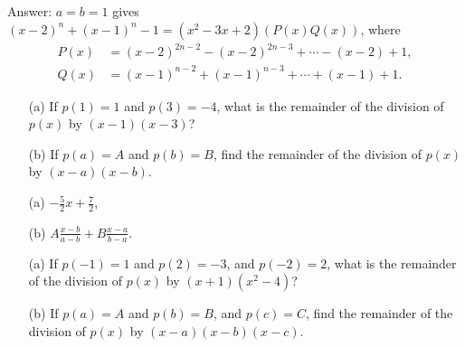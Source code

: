 \begin{solution}[name=Solution by Parviz Shahriari]
Answer: $a=b=1$ gives $(x-2)^n+(x-1)^n-1 = (x^2-3x+2)\left(P(x)Q(x)\right)$, where
\begin{align*}
    P(x) &= (x-2)^{2n-2} - (x-2)^{2n-3} + \cdots -(x-2)+1,\\
    Q(x) &= (x-1)^{n-2} + (x-1)^{n-3} + \cdots + (x-1) + 1.
\end{align*}
\end{solution}





\begin{tcolorbox}
\begin{question}
\begin{itemize}
    \item[(a)] If $p(1)=1$ and $p(3)=-4$, what is the remainder of the division of $p(x)$ by $(x-1)(x-3)$?
    \item[(b)] If $p(a)=A$ and $p(b)=B$, find the remainder of the division of $p(x)$ by $(x-a)(x-b)$. 
\end{itemize}
\end{question}
\end{tcolorbox}

\begin{solution}[name=Solution by Parviz Shahriari]
\begin{itemize}
    \item[(a)] $\displaystyle  -\frac{5}{2}x+\frac{7}{2}$,
    \item[(b)] $\displaystyle  A\frac{x-b}{a-b} + B\frac{x-a}{b-a}$.
\end{itemize}
\end{solution}




\begin{tcolorbox}
\begin{question}
\begin{itemize}
    \item[(a)] If $p(-1)=1$ and $p(2)=-3$, and $p(-2)=2$, what is the remainder of the division of $p(x)$ by $(x+1)(x^2-4)$?
    \item[(b)] If $p(a)=A$ and $p(b)=B$, and $p(c)=C$, find the remainder of the division of $p(x)$ by $(x-a)(x-b)(x-c)$. 
\end{itemize}
\end{question}
\end{tcolorbox}

